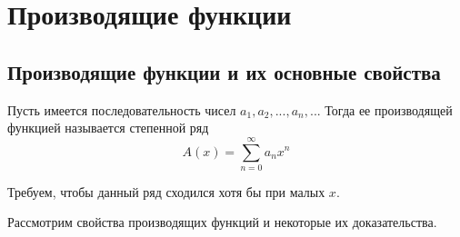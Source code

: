 \chapter{Производящие функции}
\section{Производящие функции и их основные свойства}

\begin{utv}
    Пусть имеется последовательность чисел $a_1, a_2, ..., a_n, ...$
    Тогда ее производящей функцией называется степенной ряд
    \begin{equation}
        A(x) = \sum_{n=0}^{\infty} a_nx^n
    \end{equation}
\end{utv}

Требуем, чтобы данный ряд сходился хотя бы при малых $x$.

Рассмотрим свойства производящих функций и некоторые их доказательства.


